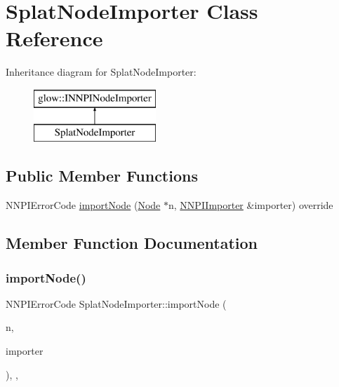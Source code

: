 \hypertarget{class_splat_node_importer}{}\section{Splat\+Node\+Importer Class Reference}
\label{class_splat_node_importer}
Inheritance diagram for Splat\+Node\+Importer\+:\begin{figure}[H]
\begin{center}
\leavevmode
\includegraphics[height=2.000000cm]{class_splat_node_importer}
\end{center}
\end{figure}
\subsection*{Public Member Functions}
\begin{DoxyCompactItemize}
\item 
N\+N\+P\+I\+Error\+Code \hyperlink{class_splat_node_importer_a4a3f01446597dfe61693f590f9f7335d}{import\+Node} (\hyperlink{classglow_1_1_node}{Node} $\ast$n, \hyperlink{classglow_1_1_n_n_p_i_importer}{N\+N\+P\+I\+Importer} \&importer) override
\end{DoxyCompactItemize}


\subsection{Member Function Documentation}
\mbox{\label{class_splat_node_importer_a4a3f01446597dfe61693f590f9f7335d}} 
\subsubsection{\texorpdfstring{import\+Node()}{importNode()}}
{\footnotesize\ttfamily N\+N\+P\+I\+Error\+Code Splat\+Node\+Importer\+::import\+Node (\begin{DoxyParamCaption}\item[{\hyperlink{classglow_1_1_node}{Node} $\ast$}]{n,  }\item[{\hyperlink{classglow_1_1_n_n_p_i_importer}{N\+N\+P\+I\+Importer} \&}]{importer }\end{DoxyParamCaption})\hspace{0.3cm}{\ttfamily [inline]}, {\ttfamily [override]}, {\ttfamily [virtual]}}

